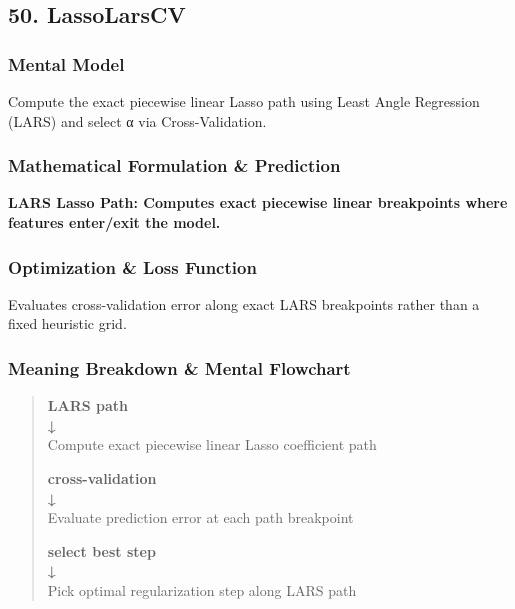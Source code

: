 \documentclass[
  10pt,
  letterpaper,
]{article}
\begin{document}
\hypertarget{lassolarscv}{%
\subsection{50. LassoLarsCV}\label{lassolarscv}}

\hypertarget{mental-model-49}{%
\subsubsection{Mental Model}\label{mental-model-49}}

Compute the exact piecewise linear Lasso path using Least Angle Regression (LARS) and select α via Cross-Validation.

\hypertarget{mathematical-formulation-prediction-49}{%
\subsubsection{Mathematical Formulation \& Prediction}\label{mathematical-formulation-prediction-49}}

\textbf{LARS Lasso Path: Computes exact piecewise linear breakpoints where features enter/exit the model.}

\hypertarget{optimization-loss-function-49}{%
\subsubsection{Optimization \& Loss Function}\label{optimization-loss-function-49}}

Evaluates cross-validation error along exact LARS breakpoints rather than a fixed heuristic grid.

\hypertarget{meaning-breakdown-mental-flowchart-49}{%
\subsubsection{Meaning Breakdown \& Mental Flowchart}\label{meaning-breakdown-mental-flowchart-49}}

\begin{quote}
\textbf{LARS path\\
↓\\
}Compute exact piecewise linear Lasso coefficient path

\textbf{cross-validation\\
↓\\
}Evaluate prediction error at each path breakpoint

\textbf{select best step\\
↓\\
}Pick optimal regularization step along LARS path
\end{quote}
\end{document}
